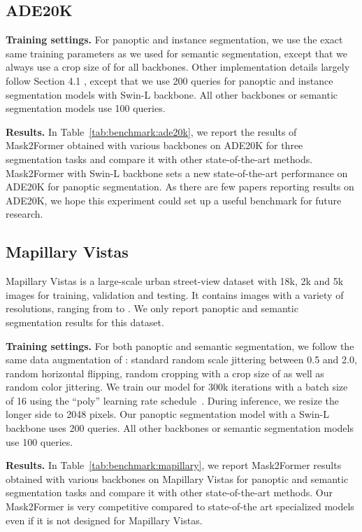 \documentclass[10pt,twocolumn,letterpaper]{article}
\newcommand{\modelname}{Mask2Former\xspace}
\newcommand{\tabref}[1]{Table~\ref{#1}}
\begin{document}
\subsection{ADE20K}

\noindent\textbf{Training settings.} For panoptic and instance segmentation, we use the exact same training parameters as we used for semantic segmentation, except that we always use a crop size of  for all backbones. Other implementation details largely follow Section 4.1
, except that we use 200 queries for panoptic and instance segmentation models with Swin-L backbone. All other backbones or semantic segmentation models use 100 queries.

\noindent\textbf{Results.} In \tabref{tab:benchmark:ade20k}, we report the results of \modelname obtained with various backbones on ADE20K for three segmentation tasks and compare it with other state-of-the-art methods. \modelname with Swin-L backbone sets a new state-of-the-art performance on ADE20K for panoptic segmentation. As there are few papers reporting results on ADE20K, we hope this experiment could set up a useful benchmark for future research.

\subsection{Mapillary Vistas}
Mapillary Vistas is a large-scale urban street-view dataset with 18k, 2k and 5k images for training, validation and testing. It contains images with a variety of resolutions, ranging from  to . We only report panoptic and semantic segmentation results for this dataset.

\noindent\textbf{Training settings.}
For both panoptic and semantic segmentation, we follow the same data augmentation of \cite{cheng2021maskformer}: standard random scale jittering between 0.5 and 2.0, random horizontal flipping, random cropping with a crop size of  as well as random color jittering. We train our model for 300k iterations with a batch size of 16 using the ``poly'' learning rate schedule~\cite{deeplabV2}. During inference, we resize the longer side to 2048 pixels. Our panoptic segmentation model with a Swin-L backbone uses 200 queries. All other backbones or semantic segmentation models use 100 queries.

\noindent\textbf{Results.}
In \tabref{tab:benchmark:mapillary}, we report \modelname results obtained with various backbones on Mapillary Vistas for panoptic and semantic segmentation tasks and compare it with other state-of-the-art methods. Our \modelname is very competitive compared to state-of-the art specialized models even if it is not designed for Mapillary Vistas.
\end{document}

